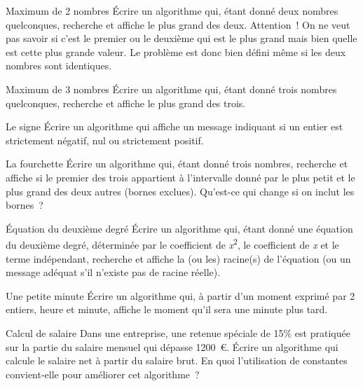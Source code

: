 \begin{Exercice}{Maximum de 2 nombres}
Écrire un algorithme qui, étant donné deux nombres quelconques,
recherche et affiche le plus grand des deux. Attention~! On ne veut
pas savoir si c’est le premier ou le deuxième qui est
le plus grand mais bien quelle est cette plus grande valeur. Le
problème est donc bien défini même si les deux nombres sont
identiques.
\end{Exercice}

\begin{Exercice}{Maximum de 3 nombres}
Écrire un algorithme qui, étant donné trois nombres quelconques,
recherche et affiche le plus grand des trois.
\end{Exercice}

\begin{Exercice}{Le signe}
Écrire un algorithme qui affiche un message indiquant
si un entier est strictement négatif, nul ou strictement
positif.
\end{Exercice}

\begin{Exercice}{La fourchette}
{
Écrire un algorithme qui, étant donné trois nombres, recherche et
affiche si le premier des trois appartient à l’intervalle donné par le
plus petit et le plus grand des deux autres (bornes exclues). Qu’est-ce
qui change si on inclut les bornes~?}
\end{Exercice}

\begin{Exercice}{Équation du deuxième degré}
{Écrire un algorithme qui, étant donné une
équation du deuxième degré, déterminée par le coefficient de
{\textit{x}}{\textsuperscript{2}},
le coefficient de
{\textit{x}} et le
terme indépendant, recherche et affiche la (ou les) racine(s) de
l’équation (ou un message adéquat s’il
n’existe pas de racine réelle).}
\end{Exercice}

\begin{Exercice}{Une petite minute}
{Écrire un algorithme qui, à partir d’un moment exprimé par 2 entiers, 
heure et minute, affiche le moment qu’il sera une minute plus tard.}
\end{Exercice}

\begin{Exercice}{Calcul de salaire}
{
Dans une entreprise, une retenue spéciale de 15\% est pratiquée sur la
partie du salaire mensuel qui dépasse 1200~€. Écrire un algorithme qui
calcule le salaire net à partir du salaire brut. En quoi l’utilisation
de constantes convient-elle pour améliorer cet algorithme~?}
\end{Exercice}


